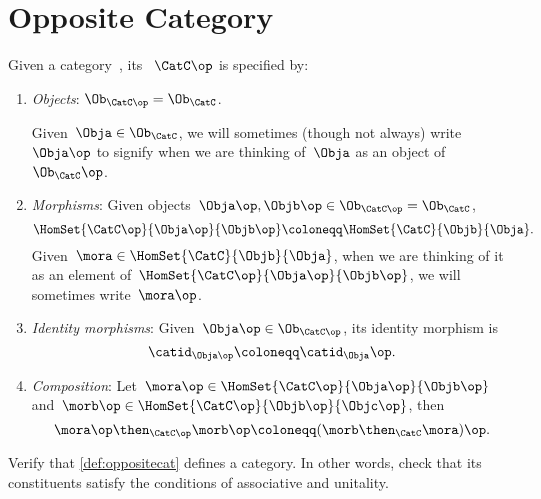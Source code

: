 

\section{Opposite Category}


\begin{ctdefinition}
    \label{def:opposite-category}
    \label{def:oppositecat}
    Given a category~\CatC, its \emph{}~$\CatC\op$ is specified by:
    \begin{enumerate}
        \item \emph{Objects}: $\Ob_{\CatC\op} = \Ob_\CatC$.
        
        Given~$\Obja \in  \Ob_\CatC$, we will sometimes (though not always) write $\Obja\op$ to signify when we are thinking of~$\Obja$ as an object of~$\Ob_\CatC\op$.
        
        \item \emph{Morphisms}: Given objects~$\Obja\op,  \Objb\op \in \Ob_{\CatC\op} = \Ob_\CatC$,
        \begin{equation}
            \label{eq:homset-op-cat}
            \HomSet{\CatC\op}{\Obja\op}{\Objb\op} \coloneqq \HomSet{\CatC}{\Objb}{\Obja}.
        \end{equation}
        Given~$\mora \in \HomSet{\CatC}{\Objb}{\Obja}$, when we are thinking of it as an element of~$\HomSet{\CatC\op}{\Obja\op}{\Objb\op}$, we will sometimes write~$\mora\op$.
        \item \emph{Identity morphisms}: Given~$\Obja\op \in \Ob_{\CatC\op}$, its identity morphism is
        \begin{equation}
            \catid_{\Obja\op} \coloneqq \catid_{\Obja}\op.
        \end{equation}
        \item \emph{Composition}: Let~$\mora\op \in \HomSet{\CatC\op}{\Obja\op}{\Objb\op}$ and~$\morb\op \in \HomSet{\CatC\op}{\Objb\op}{\Objc\op}$, then
        \begin{equation}
            \mora\op \then_{\CatC\op} \morb\op \coloneqq (\morb \then_\CatC \mora)\op.
        \end{equation}
    \end{enumerate}
\end{ctdefinition}

\begin{gradedexercise}
    \label{ex:OppositeCat}
    Verify that \cref{def:oppositecat} defines a category.
    In other words, check that its constituents satisfy the conditions of associative and unitality.
\end{gradedexercise}

